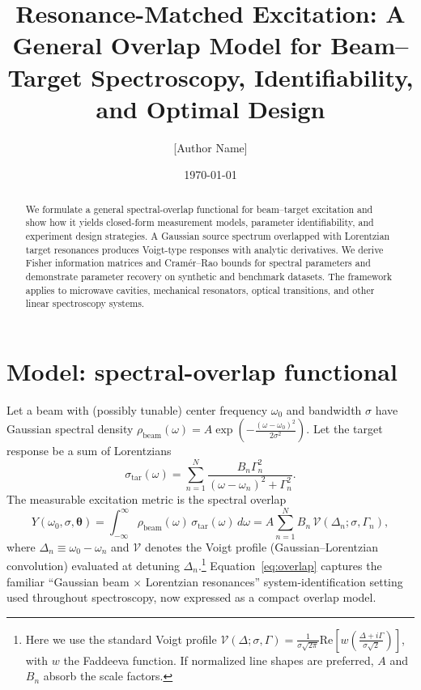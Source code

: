 \documentclass[aip,jap,preprint,amsmath,amssymb]{revtex4-2} %
\begin{document}
    \title{Resonance-Matched Excitation: A General Overlap Model for Beam–Target Spectroscopy, Identifiability, and Optimal Design}

    \author{[Author Name]}
    \affiliation{[Affiliation]}
    \date{\today}

    \begin{abstract}
        We formulate a general spectral-overlap functional for beam–target excitation and show how it yields closed-form measurement models, parameter identifiability, and experiment design strategies. A Gaussian source spectrum overlapped with Lorentzian target resonances produces Voigt-type responses with analytic derivatives. We derive Fisher information matrices and Cramér–Rao bounds for spectral parameters and demonstrate parameter recovery on synthetic and benchmark datasets. The framework applies to microwave cavities, mechanical resonators, optical transitions, and other linear spectroscopy systems.
    \end{abstract}

    \maketitle

    \section{Model: spectral-overlap functional}
        Let a beam with (possibly tunable) center frequency $\omega_0$ and bandwidth $\sigma$ have Gaussian
        spectral density $\rho_{\mathrm{beam}}(\omega) = A \exp\left(-\frac{(\omega-\omega_0)^2}{2\sigma^2}\right)$.
        Let the target response be a sum of Lorentzians
        \[
            \sigma_{\mathrm{tar}}(\omega) = \sum_{n=1}^{N} \frac{B_n \Gamma_n^2}{(\omega-\omega_n)^2 + \Gamma_n^2}.
        \]
        The measurable excitation metric is the spectral overlap
        \begin{equation}
            Y(\omega_0,\sigma,\boldsymbol{\theta}) = \int_{-\infty}^{\infty} \rho_{\mathrm{beam}}(\omega)\,\sigma_{\mathrm{tar}}(\omega)\,d\omega
            = A \sum_{n=1}^{N} B_n \,\mathcal{V}\left(\Delta_n;\sigma,\Gamma_n\right),
            \label{eq:overlap}
        \end{equation}
        where $\Delta_n \equiv \omega_0-\omega_n$ and $\mathcal{V}$ denotes the Voigt profile (Gaussian--Lorentzian
        convolution) evaluated at detuning $\Delta_n$.\footnote{Here we use the standard Voigt profile
        $\mathcal{V}(\Delta;\sigma,\Gamma) = \frac{1}{\sigma\sqrt{2\pi}}\mathrm{Re}\left[w\left(\frac{\Delta+i\Gamma}{\sigma\sqrt{2}}\right)\right]$,
        with $w$ the Faddeeva function. If normalized line shapes are preferred, $A$ and $B_n$ absorb the scale
        factors.}
        Equation~\eqref{eq:overlap} captures the familiar ``Gaussian beam $\times$ Lorentzian resonances''
        system-identification setting used throughout spectroscopy, now expressed as a compact overlap model.
\end{document}
